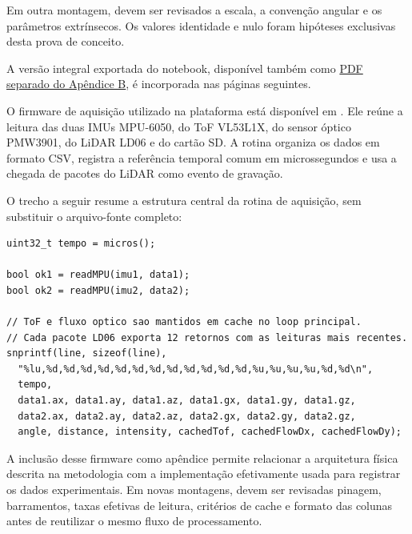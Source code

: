 Em outra montagem, devem ser revisados a escala, a convenção angular e os parâmetros extrínsecos. Os valores identidade e nulo foram hipóteses exclusivas desta prova de conceito.

A versão integral exportada do notebook, disponível também como \href{run:apendice_b_processamento_nuvem_lidar.pdf}{PDF separado do Apêndice B}, é incorporada nas páginas seguintes.



\label{ap:arduino}

O firmware de aquisição utilizado na plataforma está disponível em . Ele reúne a leitura das duas IMUs MPU-6050, do ToF VL53L1X, do sensor óptico PMW3901, do LiDAR LD06 e do cartão SD. A rotina organiza os dados em formato CSV, registra a referência temporal comum em microssegundos e usa a chegada de pacotes do LiDAR como evento de gravação.

O trecho a seguir resume a estrutura central da rotina de aquisição, sem substituir o arquivo-fonte completo:

\begin{verbatim}
uint32_t tempo = micros();

bool ok1 = readMPU(imu1, data1);
bool ok2 = readMPU(imu2, data2);

// ToF e fluxo optico sao mantidos em cache no loop principal.
// Cada pacote LD06 exporta 12 retornos com as leituras mais recentes.
snprintf(line, sizeof(line),
  "%lu,%d,%d,%d,%d,%d,%d,%d,%d,%d,%d,%d,%d,%u,%u,%u,%u,%d,%d\n",
  tempo,
  data1.ax, data1.ay, data1.az, data1.gx, data1.gy, data1.gz,
  data2.ax, data2.ay, data2.az, data2.gx, data2.gy, data2.gz,
  angle, distance, intensity, cachedTof, cachedFlowDx, cachedFlowDy);
\end{verbatim}

A inclusão desse firmware como apêndice permite relacionar a arquitetura física descrita na metodologia com a implementação efetivamente usada para registrar os dados experimentais. Em novas montagens, devem ser revisadas pinagem, barramentos, taxas efetivas de leitura, critérios de cache e formato das colunas antes de reutilizar o mesmo fluxo de processamento.
